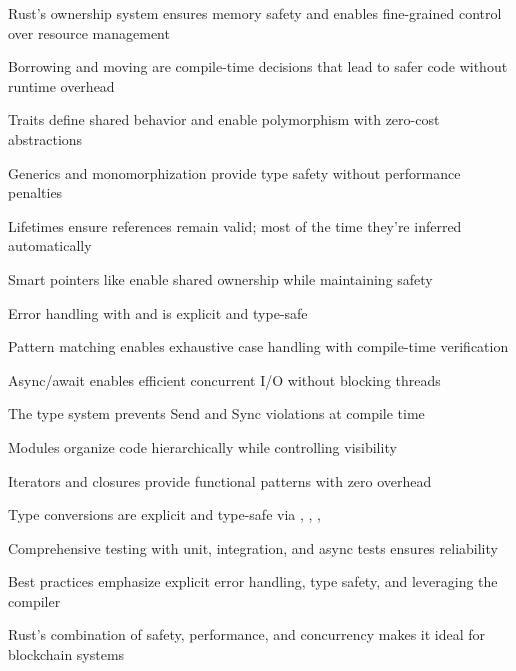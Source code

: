 \begin{chaptersummary}
\item Rust's ownership system ensures memory safety and enables fine-grained control over resource management
\item Borrowing and moving are compile-time decisions that lead to safer code without runtime overhead
\item Traits define shared behavior and enable polymorphism with zero-cost abstractions
\item Generics and monomorphization provide type safety without performance penalties
\item Lifetimes ensure references remain valid; most of the time they're inferred automatically
\item Smart pointers like  enable shared ownership while maintaining safety
\item Error handling with  and  is explicit and type-safe
\item Pattern matching enables exhaustive case handling with compile-time verification
\item Async/await enables efficient concurrent I/O without blocking threads
\item The type system prevents Send and Sync violations at compile time
\item Modules organize code hierarchically while controlling visibility
\item Iterators and closures provide functional patterns with zero overhead
\item Type conversions are explicit and type-safe via , , , 
\item Comprehensive testing with unit, integration, and async tests ensures reliability
\item Best practices emphasize explicit error handling, type safety, and leveraging the compiler
\item Rust's combination of safety, performance, and concurrency makes it ideal for blockchain systems
\end{chaptersummary}


